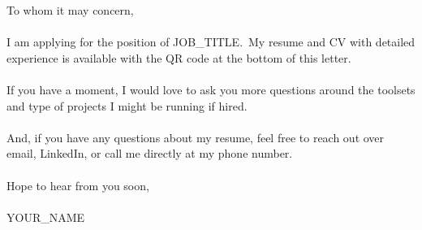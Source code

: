 
\large{To whom it may concern,\\
\\
I am applying for the position of JOB\_TITLE.\ My resume and CV with
detailed experience is available with the QR code at the bottom of this
letter.\ \lipsum[12]\\
\\
If you have a moment, I would love to ask you more
questions around the toolsets and type of projects I might be running if
hired.\\
\\
And, if you have any questions about my resume, feel free to reach out over
email, LinkedIn, or call me directly at my phone number.\\
\\
Hope to hear from you soon,\\
\\
YOUR\_NAME}